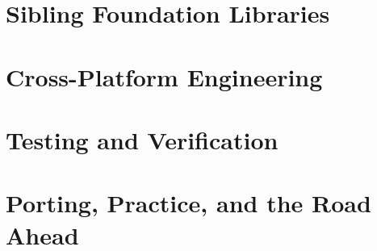 \documentclass[11pt,twoside,openright]{book}
\begin{document}
\part{Sibling Foundation Libraries}
\label{part:sibling-libraries}



\part{Cross-Platform Engineering}
\label{part:cross-platform}








\part{Testing and Verification}
\label{part:testing-verification}







\part{Porting, Practice, and the Road Ahead}
\label{part:porting-practice}







\appendix










\backmatter
{\footnotesize\printindex}
\end{document}
